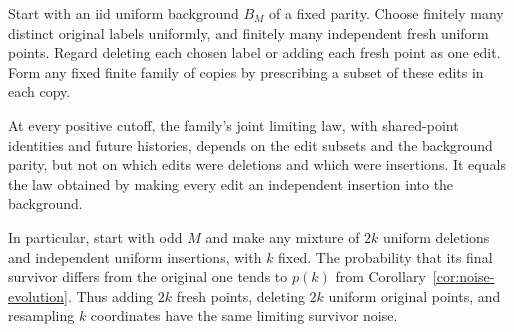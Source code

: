 \documentclass[11pt,letterpaper]{article}
\begin{document}
\begin{theorem}
\label{thm:edit-universality}
Start with an iid uniform background $B_M$ of a fixed parity.
Choose finitely many distinct original labels uniformly, and finitely
many independent fresh uniform points. Regard deleting each chosen
label or adding each fresh point as one edit. Form any fixed finite
family of copies by prescribing a subset of these edits in each copy.

At every positive cutoff, the family's joint limiting law, with
shared-point identities and future histories, depends on the edit
subsets and the background parity, but not on which edits were
deletions and which were insertions. It equals the law obtained
by making every edit an independent insertion into the background.

In particular, start with odd $M$ and make any mixture of $2k$
uniform deletions and independent uniform insertions, with $k$ fixed.
The probability that its final survivor differs from the original
one tends to $p(k)$ from Corollary~\ref{cor:noise-evolution}.
Thus adding $2k$ fresh points, deleting $2k$ uniform original points,
and resampling $k$ coordinates have the same limiting survivor noise.
\end{theorem}
\end{document}
